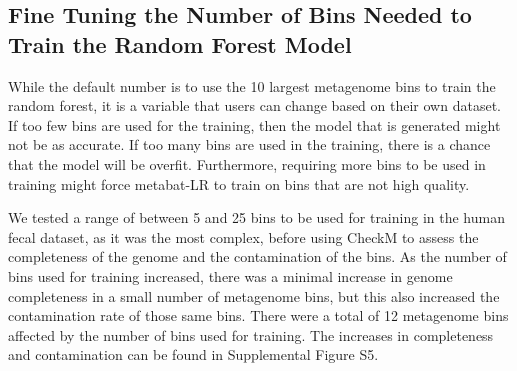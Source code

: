 \documentclass[fleqn,10pt,lineno]{wlpeerj}
\begin{document}

\subsection*{Fine Tuning the Number of Bins Needed to Train the Random Forest Model}
While the default number is to use the 10 largest metagenome bins to train the random forest, it is a variable that users can change based on their own dataset. If too few bins are used for the training, then the model that is generated might not be as accurate. If too many bins are used in the training, there is a chance that the model will be overfit. Furthermore, requiring more bins to be used in training might force metabat-LR to train on bins that are not high quality. 

We tested a range of between 5 and 25 bins to be used for training in the human fecal dataset, as it was the most complex, before using CheckM to assess the completeness of the genome and the contamination of the bins.  As the number of bins used for training increased, there was a minimal increase in genome completeness in a small number of metagenome bins, but this also increased the contamination rate of those same bins. There were a total of 12 metagenome bins affected by the number of bins used for training. The increases in completeness and contamination can be found in Supplemental Figure S5.     


 

\end{document}
